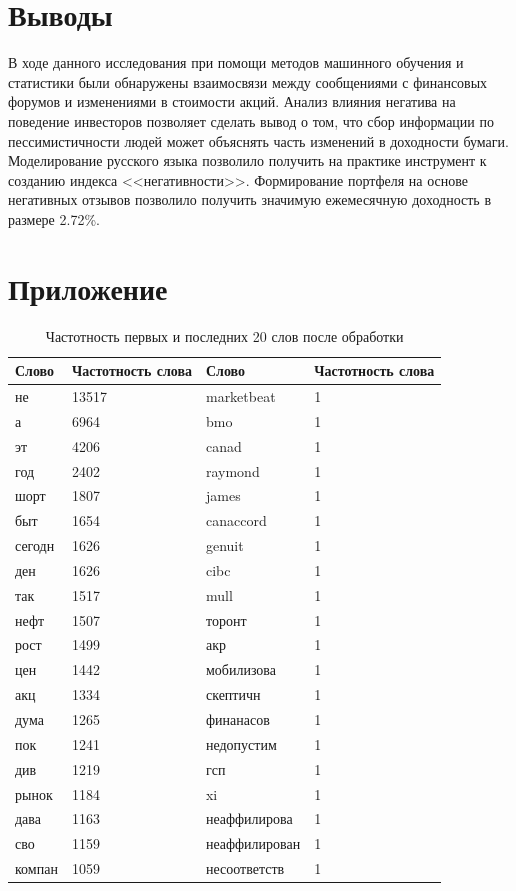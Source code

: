 \documentclass{article}
\begin{document}
\section{Выводы}
\label{sec:conclusion}
В ходе данного исследования при помощи методов машинного обучения и статистики были обнаружены взаимосвязи между сообщениями с финансовых форумов и изменениями в стоимости акций. Анализ влияния негатива на поведение инвесторов позволяет сделать вывод о том, что сбор информации по пессимистичности людей может объяснять часть изменений в доходности бумаги. Моделирование русского языка позволило получить на практике инструмент к созданию индекса <<негативности>>. Формирование портфеля на основе негативных отзывов позволило получить значимую ежемесячную доходность в размере 2.72\%.



\newpage
\section{Приложение}


\label{chap:additional}


\begin{table}[h]
	\caption{Частотность первых и последних 20 слов после обработки}
	\label{tab:table4}
	\centering
	\begin{tabular}{llll}
		\toprule
		Слово & Частотность слова &Слово & Частотность слова\\
		\midrule
		не & 13517 & marketbeat & 1\\ 
		а & 6964 & bmo & 1\\ 
		эт & 4206 & canad & 1\\ 
		год & 2402 & raymond & 1\\ 
		шорт & 1807 & james & 1\\ 
		быт & 1654 & canaccord & 1\\ 
		сегодн & 1626 & genuit & 1\\ 
		ден & 1626 & cibc & 1\\ 
		так & 1517 & mull & 1\\ 
		нефт & 1507 & торонт & 1\\ 
		рост & 1499 & акр & 1\\ 
		цен & 1442 & мобилизова & 1\\ 
		акц & 1334 & скептичн & 1\\ 
		дума & 1265 & финанасов & 1\\ 
		пок & 1241 & недопустим & 1\\ 
		див & 1219 & гсп & 1\\ 
		рынок & 1184 & xi & 1\\ 
		дава & 1163 & неаффилирова & 1\\ 
		сво & 1159 & неаффилирован & 1\\ 
		компан & 1059 & несоответств & 1\\
		\bottomrule
	\end{tabular}
	\label{tab:table3}
\end{table}
\end{document}
